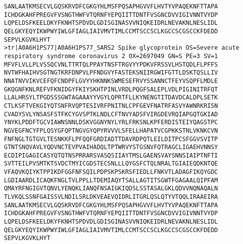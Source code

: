 \documentclass[en,black,12pt,normal]{elegantnote}
\begin{document}
\begin{lstlisting}
SANLAATKMSECVLGQSKRVDFCGKGYHLMSFPQSAPHGVVFLHVTYVPAQEKNFTTAPA
ICHDGKAHFPREGVFVSNGTHWFVTQRNFYEPQIITTDNTFVSGNCDVVIGIVNNTVYDP
LQPELDSFKEELDKYFKNHTSPDVDLGDISGINASVVNIQKEIDRLNEVAKNLNESLIDL
QELGKYEQYIKWPWYIWLGFIAGLIAIVMVTIMLCCMTSCCSCLKGCCSCGSCCKFDEDD
SEPVLKGVKLHYT
>tr|A0A6H1PS77|A0A6H1PS77_SARS2 Spike glycoprotein OS=Severe acute respiratory syndrome coronavirus 2 OX=2697049 GN=S PE=3 SV=1
MFVFLVLLPLVSSQCVNLTTRTQLPPAYTNSFTRGVYYPDKVFRSSVLHSTQDLFLPFFS
NVTWFHAIHVSGTNGTKRFDNPVLPFNDGVYFASTEKSNIIRGWIFGTTLDSKTQSLLIV
NNATNVVIKVCEFQFCNDPFLGVYYHKNNKSWMESEFRVYSSANNCTFEYVSQPFLMDLE
GKQGNFKNLREFVFKNIDGYFKIYSKHTPINLVRDLPQGFSALEPLVDLPIGINITRFQT
LLALHRSYLTPGDSSSGWTAGAAAYYVGYLQPRTFLLKYNENGTITDAVDCALDPLSETK
CTLKSFTVEKGIYQTSNFRVQPTESIVRFPNITNLCPFGEVFNATRFASVYAWNRKRISN
CVADYSVLYNSASFSTFKCYGVSPTKLNDLCFTNVYADSFVIRGDEVRQIAPGQTGKIAD
YNYKLPDDFTGCVIAWNSNNLDSKVGGNYNYLYRLFRKSNLKPFERDISTEIYQAGSTPC
NGVEGFNCYFPLQSYGFQPTNGVGYQPYRVVVLSFELLHAPATVCGPKKSTNLVKNKCVN
FNFNGLTGTGVLTESNKKFLPFQQFGRDIADTTDAVRDPQTLEILDITPCSFGGVSVITP
GTNTSNQVAVLYQDVNCTEVPVAIHADQLTPTWRVYSTGSNVFQTRAGCLIGAEHVNNSY
ECDIPIGAGICASYQTQTNSPRRARSVASQSIIAYTMSLGAENSVAYSNNSIAIPTNFTI
SVTTEILPVSMTKTSVDCTMYICGDSTECSNLLLQYGSFCTQLNRALTGIAIEQDKNTQE
VFAQVKQIYKTPPIKDFGGFNFSQILPDPSKPSKRSFIEDLLFNKVTLADAGFIKQYGDC
LGDIAARDLICAQKFNGLTVLPPLLTDEMIAQYTSALLAGTITSGWTFGAGAALQIPFAM
QMAYRFNGIGVTQNVLYENQKLIANQFNSAIGKIQDSLSSTASALGKLQDVVNQNAQALN
TLVKQLSSNFGAISSVLNDILSRLDKVEAEVQIDRLITGRLQSLQTYVTQQLIRAAEIRA
SANLAATKMSECVLGQSKRVDFCGKGYHLMSFPQSAPHGVVFLHVTYVPAQEKNFTTAPA
ICHDGKAHFPREGVFVSNGTHWFVTQRNFYEPQIITTDNTFVSGNCDVVIGIVNNTVYDP
LQPELDSFKEELDKYFKNHTSPDVDLGDISGINASVVNIQKEIDRLNEVAKNLNESLIDL
QELGKYEQYIKWPWYIWLGFIAGLIAIVMVTIMLCCMTSCCSCLKGCCSCGSCCKFDEDD
SEPVLKGVKLHYT
\end{lstlisting}

{}
\end{document}
